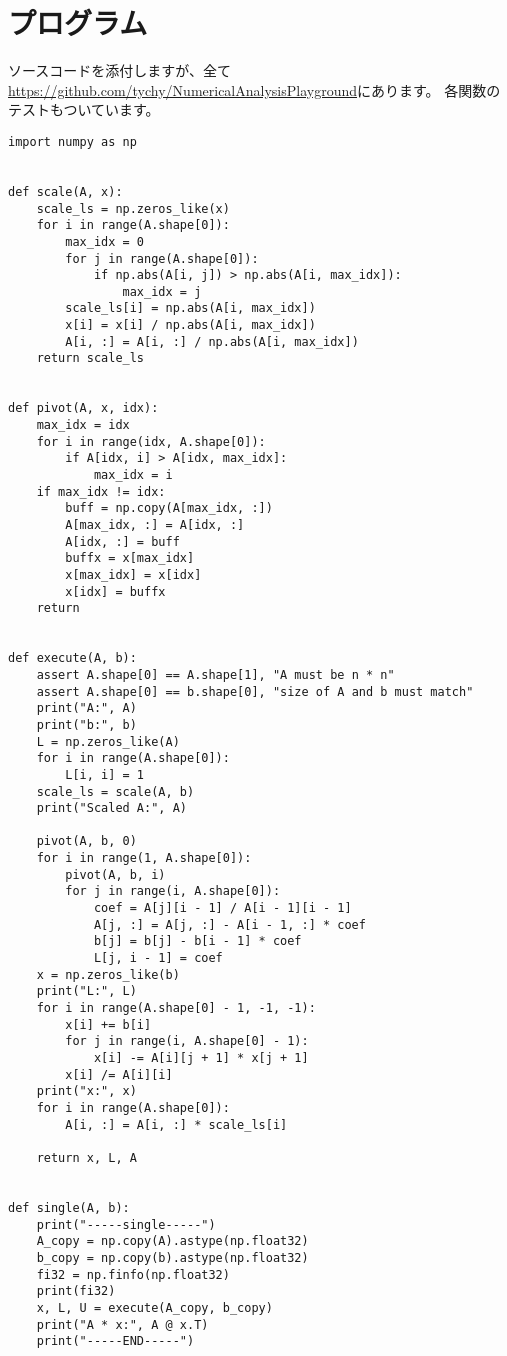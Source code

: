 \documentclass{jsarticle}
\begin{document}
\section{プログラム}
ソースコードを添付しますが、全て
\href{https://github.com/tychy/NumericalAnalysisPlayground}{https://github.com/tychy/NumericalAnalysisPlayground}にあります。
各関数のテストもついています。
\begin{lstlisting}[caption=gaussの消去法,label=参照ラベル]
import numpy as np


def scale(A, x):
    scale_ls = np.zeros_like(x)
    for i in range(A.shape[0]):
        max_idx = 0
        for j in range(A.shape[0]):
            if np.abs(A[i, j]) > np.abs(A[i, max_idx]):
                max_idx = j
        scale_ls[i] = np.abs(A[i, max_idx])
        x[i] = x[i] / np.abs(A[i, max_idx])
        A[i, :] = A[i, :] / np.abs(A[i, max_idx])
    return scale_ls


def pivot(A, x, idx):
    max_idx = idx
    for i in range(idx, A.shape[0]):
        if A[idx, i] > A[idx, max_idx]:
            max_idx = i
    if max_idx != idx:
        buff = np.copy(A[max_idx, :])
        A[max_idx, :] = A[idx, :]
        A[idx, :] = buff
        buffx = x[max_idx]
        x[max_idx] = x[idx]
        x[idx] = buffx
    return


def execute(A, b):
    assert A.shape[0] == A.shape[1], "A must be n * n"
    assert A.shape[0] == b.shape[0], "size of A and b must match"
    print("A:", A)
    print("b:", b)
    L = np.zeros_like(A)
    for i in range(A.shape[0]):
        L[i, i] = 1
    scale_ls = scale(A, b)
    print("Scaled A:", A)

    pivot(A, b, 0)
    for i in range(1, A.shape[0]):
        pivot(A, b, i)
        for j in range(i, A.shape[0]):
            coef = A[j][i - 1] / A[i - 1][i - 1]
            A[j, :] = A[j, :] - A[i - 1, :] * coef
            b[j] = b[j] - b[i - 1] * coef
            L[j, i - 1] = coef
    x = np.zeros_like(b)
    print("L:", L)
    for i in range(A.shape[0] - 1, -1, -1):
        x[i] += b[i]
        for j in range(i, A.shape[0] - 1):
            x[i] -= A[i][j + 1] * x[j + 1]
        x[i] /= A[i][i]
    print("x:", x)
    for i in range(A.shape[0]):
        A[i, :] = A[i, :] * scale_ls[i]

    return x, L, A


def single(A, b):
    print("-----single-----")
    A_copy = np.copy(A).astype(np.float32)
    b_copy = np.copy(b).astype(np.float32)
    fi32 = np.finfo(np.float32)
    print(fi32)
    x, L, U = execute(A_copy, b_copy)
    print("A * x:", A @ x.T)
    print("-----END-----")



\end{lstlisting}
\end{document}
